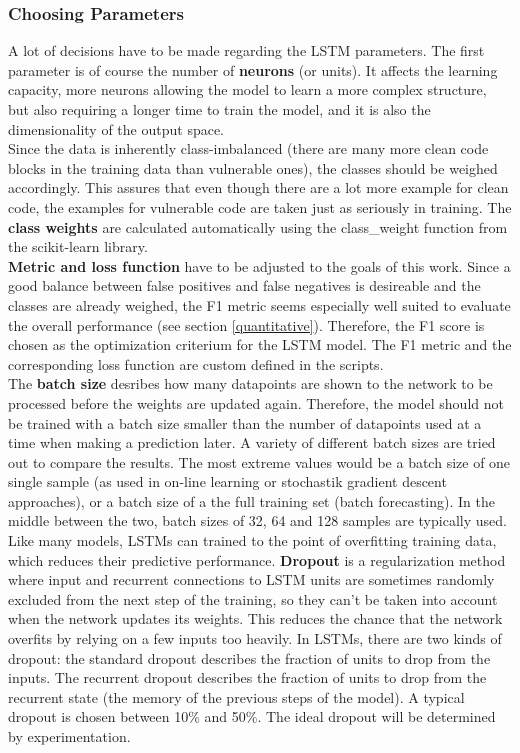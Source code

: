 \documentclass[
	a4paper,
	pagesize,
	pdftex,
	12pt,
	twoside, %
	BCOR=5mm, %
	ngerman,
	fleqn,
	final,
	]{scrartcl}
\begin{document}
\subsubsection{Choosing Parameters}

A lot of decisions have to be made regarding the LSTM parameters.%
The first parameter is of course the number of \textbf{neurons} (or units). It affects the learning capacity, more neurons allowing the model to learn a more complex structure, but also requiring a longer time to train the model, and it is also the dimensionality of the output space.\\  
Since the data is inherently class-imbalanced (there are many more clean code blocks in the training data than vulnerable ones), the classes should be weighed accordingly. This assures that even though there are a lot more example for clean code, the examples for vulnerable code are taken just as seriously in training. The \textbf{class weights} are calculated automatically using the class\_weight function from the scikit-learn library.\\
\textbf{Metric and loss function} have to be adjusted to the goals of this work. Since a good balance between false positives and false negatives is desireable and the classes are already weighed, the F1 metric seems especially well suited to evaluate the overall performance (see section \ref{quantitative}). Therefore, the F1 score is chosen as the optimization criterium for the LSTM model. The F1 metric and the corresponding loss function are custom defined in the scripts.\\
The \textbf{batch size} desribes how many datapoints are shown to the network to be processed before the weights are updated again. Therefore, the model should not be trained with a batch size smaller than the number of datapoints used at a time when making a prediction later. A variety of different batch sizes are tried out to compare the results. The most extreme values would be a batch size of one single sample (as used in on-line learning or stochastik gradient descent approaches), or a batch size of a the full training set (batch forecasting). In the middle between the two, batch sizes of 32, 64 and 128 samples are typically used.\\
Like many models, LSTMs can trained to the point of overfitting training data, which reduces their predictive performance. \textbf{Dropout} is a regularization method where input and recurrent connections to LSTM units are sometimes randomly excluded from the next step of the training, so they can't be taken into account when the network updates its weights. This reduces the chance that the network overfits by relying on a few inputs too heavily. In LSTMs, there are two kinds of dropout: the standard dropout describes the fraction of units to drop from the inputs. The recurrent dropout describes the fraction of units to drop from the recurrent state (the memory of the previous steps of the model). A typical dropout is chosen between 10\% and 50\%. The ideal dropout will be determined by experimentation.\\
\end{document}
